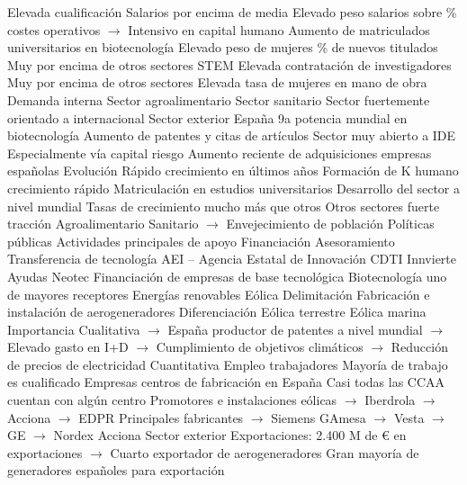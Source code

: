 \documentclass{nuevotema}
\begin{document}
\begin{esquemal}
				\4 Elevada cualificación
				\4 Salarios por encima de media
				\4 Elevado peso salarios sobre \% costes operativos
				\4[] $\to$ Intensivo en capital humano
				\4 Aumento de matriculados universitarios en biotecnología
				\4 Elevado peso de mujeres
				\% de nuevos titulados
				\4[] Muy por encima de otros sectores STEM
				\4 Elevada contratación de investigadores
				\4[] Muy por encima de otros sectores
				\4 Elevada tasa de mujeres en mano de obra
			\3 Demanda interna
				\4 Sector agroalimentario
				\4 Sector sanitario
				\4 Sector fuertemente orientado a internacional
			\3 Sector exterior
				\4 España 9a potencia mundial en biotecnología
				\4 Aumento de patentes y citas de artículos
				\4 Sector muy abierto a IDE
				\4 Especialmente vía capital riesgo
				\4 Aumento reciente de adquisiciones empresas españolas
			\3 Evolución
				\4 Rápido crecimiento en últimos años
				\4 Formación de K humano crecimiento rápido
				\4[] Matriculación en estudios universitarios
				\4 Desarrollo del sector a nivel mundial
				\4[] Tasas de crecimiento mucho más que otros
				\4 Otros sectores fuerte tracción
				\4[] Agroalimentario
				\4[] Sanitario
				\4[] $\to$ Envejecimiento de población
			\3 Políticas públicas
				\4 Actividades principales de apoyo
				\4[] Financiación
				\4[] Asesoramiento
				\4[] Transferencia de tecnología
				\4 AEI -- Agencia Estatal de Innovación
				\4 CDTI
				\4[] Innvierte
				\4 Ayudas Neotec
				\4[] Financiación de empresas de base tecnológica
				\4[] Biotecnología uno de mayores receptores
		\2 Energías renovables
			\3 Eólica
				\4 Delimitación
				\4[] Fabricación e instalación de aerogeneradores
				\4 Diferenciación
				\4[] Eólica terrestre
				\4[] Eólica marina
				\4 Importancia
				\4[] Cualitativa
				\4[] $\to$ España productor de patentes a nivel mundial
				\4[] $\to$ Elevado gasto en I+D
				\4[] $\to$ Cumplimiento de objetivos climáticos
				\4[] $\to$ Reducción de precios de electricidad
				\4[] Cuantitativa
				\4 Empleo
				 trabajadores
				\4[] Mayoría de trabajo es cualificado
				\4 Empresas
				 centros de fabricación en España
				\4[] Casi todas las CCAA cuentan con algún centro
				\4[] Promotores e instalaciones eólicas
				\4[] $\to$ Iberdrola
				\4[] $\to$ Acciona
				\4[] $\to$ EDPR
				\4[] Principales fabricantes
				\4[] $\to$ Siemens GAmesa
				\4[] $\to$ Vesta
				\4[] $\to$ GE
				\4[] $\to$ Nordex Acciona
				\4 Sector exterior
				\4[] Exportaciones: 2.400 M de € en exportaciones
				\4[] $\to$ Cuarto exportador de aerogeneradores
				\4[] Gran mayoría de generadores españoles para exportación

\end{esquemal}
\end{document}
